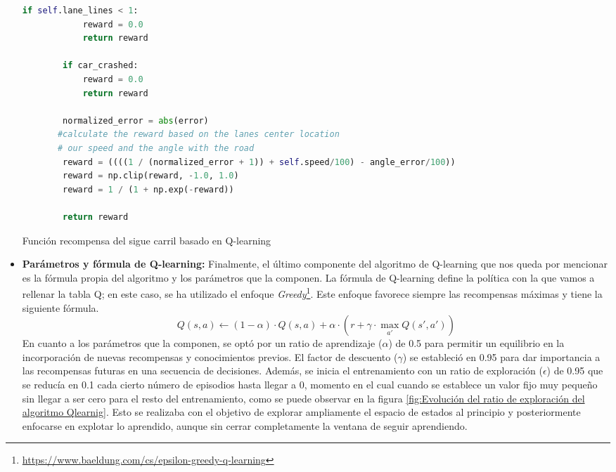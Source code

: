 \begin{itemize}
\begin{code}[H]
\begin{lstlisting}[language=Python]
        if self.lane_lines < 1:
            reward = 0.0
            return reward
            
        if car_crashed:
            reward = 0.0
            return reward

        normalized_error = abs(error)
       #calculate the reward based on the lanes center location
       # our speed and the angle with the road
        reward = ((((1 / (normalized_error + 1)) + self.speed/100) - angle_error/100))
        reward = np.clip(reward, -1.0, 1.0)
        reward = 1 / (1 + np.exp(-reward))

        return reward
	\end{lstlisting}
\caption[Función recompensa del sigue carril basado en de Q-learning]{Función recompensa del sigue carril basado en Q-learning}
\label{cod:Función recompensa del algoritmo de qlearning}
\end{code}
 
 \bigskip
 
 \item \textbf{Parámetros y fórmula de Q-learning:} Finalmente, el último componente del algoritmo de Q-learning que nos queda por mencionar es la fórmula propia del algoritmo y los parámetros que la componen. La fórmula de Q-learning define la política con la que vamos a rellenar la tabla Q; en este caso, se ha utilizado el enfoque \textit{Greedy}\footnote{\url{https://www.baeldung.com/cs/epsilon-greedy-q-learning}}. Este enfoque favorece siempre las recompensas máximas y tiene la siguiente fórmula. \begin{equation}Q(s, a) \leftarrow (1-\alpha) \cdot Q(s, a) + \alpha \cdot \left( r + \gamma \cdot \max_{a'} Q(s', a') \right)\end{equation} En cuanto a los parámetros que la componen, se optó por un ratio de aprendizaje (\(\alpha\)) de 0.5 para permitir un equilibrio en la incorporación de nuevas recompensas y conocimientos previos. El factor de descuento (\(\gamma\)) se estableció en 0.95 para dar importancia a las recompensas futuras en una secuencia de decisiones. Además, se inicia el entrenamiento con un ratio de exploración (\(\epsilon\)) de 0.95 que se reducía en 0.1 cada cierto número de episodios hasta llegar a 0, momento en el cual cuando se establece un valor fijo muy pequeño sin llegar a ser cero para el resto del entrenamiento, como se puede observar en la figura \ref{fig:Evolución del ratio de exploración del algoritmo Qlearnig}. Esto se realizaba con el objetivo de explorar ampliamente el espacio de estados al principio y posteriormente enfocarse en explotar lo aprendido, aunque sin cerrar completamente la ventana de seguir aprendiendo.
      

\end{itemize}
